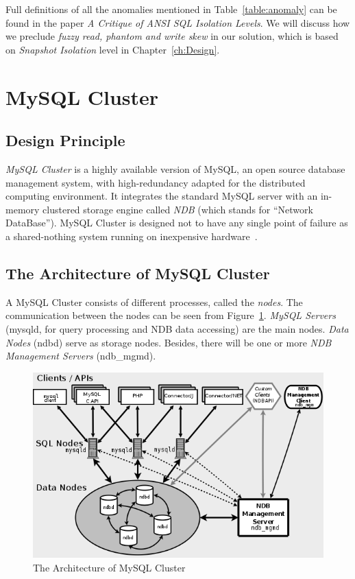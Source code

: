 \noindent Full definitions of all the anomalies mentioned in Table~\ref{table:anomaly} can be found in the paper \textit{A Critique of ANSI SQL Isolation Levels}. We will discuss how we preclude \textit{fuzzy read, phantom and write skew} in our solution, which is based on \textit{Snapshot Isolation} level in Chapter~\ref{ch:Design}.
\section{MySQL Cluster}

\subsection{Design Principle}
\textit{MySQL Cluster} is a highly available version of MySQL, an open source database management system, with high-redundancy adapted for the distributed computing environment. It integrates the standard MySQL server with an in-memory clustered storage engine called \textit{NDB} (which stands for “Network DataBase”). MySQL Cluster is designed not to have any single point of failure as a shared-nothing system running on inexpensive hardware~\cite{mysqlcluster}.

\subsection{The Architecture of MySQL Cluster}
\noindent A MySQL Cluster consists of different processes, called the \textit{nodes}. The communication between the nodes can be seen from Figure~\ref{fig:mysqlclusterarchitecture}. \textit{MySQL Servers} (mysqld, for query processing and NDB data accessing) are the main nodes. \textit{Data Nodes} (ndbd) serve as storage nodes. Besides, there will be one or more \textit{NDB Management Servers} (ndb\_mgmd).

\begin{figure}[h!]
	\centering
	\includegraphics[scale=0.4]{figs/mysqlcluster.png}
	\caption{The Architecture of MySQL Cluster \protect \cite{mysqlcluster}}
	\label{fig:mysqlclusterarchitecture}
\end{figure}

